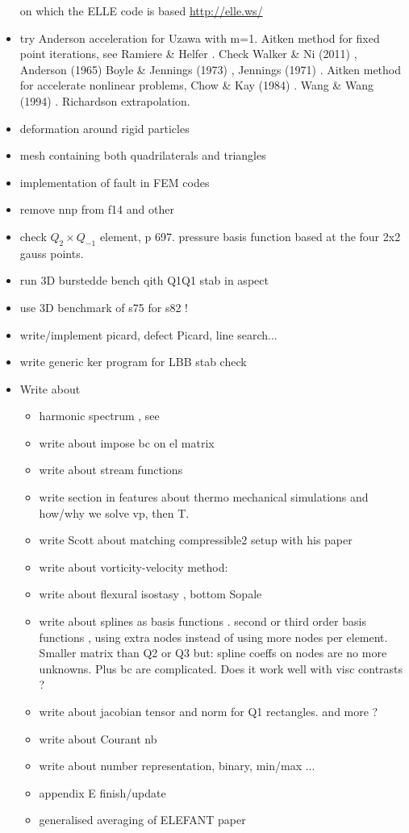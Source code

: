 \begin{itemize}
on which the ELLE code is based \url{http://elle.ws/} 
\item try Anderson acceleration for Uzawa \cite{hoow17} with m=1. Aitken method for 
fixed point iterations, see Ramiere \& Helfer \cite{rahe15}.
Check Walker \& Ni (2011) \cite{wani11}, Anderson (1965) \cite{ande65}
Boyle \& Jennings (1973) \cite{boje73}, Jennings (1971) \cite{jenn71}.
Aitken method for accelerate nonlinear problems, Chow \& Kay (1984) \cite{chka84}.
Wang \& Wang (1994) \cite{wawa94}. Richardson extrapolation. 
\item deformation around rigid particles \cite{ilma93}
\item mesh containing both quadrilaterals and triangles \cite{anbr80}
\item implementation of fault in FEM codes \cite{zhgu94,zhgu95}
\item remove nnp from f14 and other \stones
\item check $Q_2 \times Q_{-1}$ element, \cite{grsa} p 697. pressure basis function based at the four 2x2 gauss points.
\item run 3D burstedde bench qith Q1Q1 stab in aspect
\item use 3D benchmark of s75 for s82 !
\item write/implement picard, defect Picard, line search...
\item write generic ker program for LBB stab check
\item Write about

  \begin{itemize}
  \item harmonic spectrum , see \cite{ribr99}
  \item write about impose bc on el matrix
  \item write about stream functions 
  \item write section in features about thermo mechanical simulations and how/why we solve vp, then T.
  \item write Scott about matching compressible2 setup with his paper
  \item write about vorticity-velocity method: \cite{gats91,gust93,dehu95,ergq99,amct04,spez87}
  \item write about flexural isostasy \cite{maie12}, bottom Sopale
  \item write about splines as basis functions \cite{chri92}. second or third order basis functions , using extra nodes instead of using more nodes per element. 
  Smaller matrix than Q2 or Q3 but: spline coeffs on nodes are no more unknowns. Plus bc are complicated. Does it work well with visc contrasts ?
  \item write about jacobian tensor and norm for Q1 rectangles. and more ?
  \item write about Courant nb
  \item write about number representation, binary, min/max ... 
  \item appendix E finish/update
  \item generalised averaging of ELEFANT paper
  \it
  \end{itemize}
\end{itemize}

